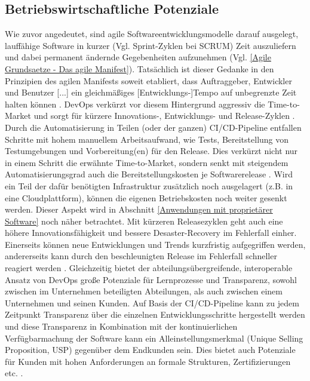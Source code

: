 \subsection{Betriebswirtschaftliche Potenziale}
\label{Betriebswirtschaftliche Potenziale}
Wie zuvor angedeutet, sind agile Softwareentwicklungsmodelle darauf ausgelegt, lauffähige Software in kurzer (Vgl. Sprint-Zyklen bei \gls{SCRUM}) Zeit auszuliefern und dabei permanent ändernde Gegebenheiten aufzunehmen (Vgl. \ref{Agile Grundsaetze - Das agile Manifest}). Tatsächlich ist dieser Gedanke in den Prinzipien des agilen Manifests soweit etabliert, dass \glqq Auftraggeber, Entwickler und Benutzer [...] ein gleichmäßiges [Entwicklungs-]Tempo auf unbegrenzte Zeit halten können\grqq{} \cite{beck_prinzipien_2001}.\newline
\gls{DevOps} verkürzt vor diesem Hintergrund aggressiv die \gls{Time-to-Market} und sorgt für kürzere Innovations-, Entwicklungs- und Release-Zyklen \cite{forsgren_devops_2015}. Durch die Automatisierung in Teilen (oder der ganzen) \acrshort{CI}/\acrshort{CD}-Pipeline entfallen Schritte mit hohem manuellem Arbeitsaufwand, wie Tests, Bereitstellung von Testumgebungen und Vorbereitung(en) für den Release. Dies verkürzt nicht nur in einem Schritt die erwähnte \gls{Time-to-Market}, sondern senkt mit steigendem Automatisierungsgrad auch die Bereitstellungskosten je Softwarerelease \cite{forsgren_devops_2015}.
Wird ein Teil der dafür benötigten Infrastruktur zusätzlich noch ausgelagert (z.B. in eine Cloudplattform), können die eigenen Betriebskosten noch weiter gesenkt werden. Dieser Aspekt wird in Abschnitt \ref{Anwendungen mit proprietärer Software} noch näher betrachtet.\newline
Mit kürzeren Releasezyklen geht auch eine höhere Innovationsfähigkeit und bessere Desaster-Recovery im Fehlerfall einher. Einerseits können neue Entwicklungen und Trends kurzfristig aufgegriffen werden, andererseits kann durch den beschleunigten Release im Fehlerfall schneller reagiert werden \cite{forsgren_devops_2015}.
Gleichzeitig bietet der abteilungsübergreifende, interoperable Ansatz von \gls{DevOps} große Potenziale für Lernprozesse und Transparenz, sowohl zwischen im Unternehmen beteiligten Abteilungen, als auch zwischen einem Unternehmen und seinen Kunden.
Auf Basis der \acrshort{CI}/\acrshort{CD}-Pipeline kann zu jedem Zeitpunkt Transparenz über die einzelnen Entwicklungsschritte hergestellt werden und diese Transparenz in Kombination mit der kontinuierlichen Verfügbarmachung der Software kann ein Alleinstellungsmerkmal (Unique Selling Proposition, \acrshort{USP}) gegenüber dem Endkunden sein. Dies bietet auch Potenziale für Kunden mit hohen Anforderungen an formale Strukturen, Zertifizierungen etc. \cite[Kap. 7.2]{leite_survey_2020}.